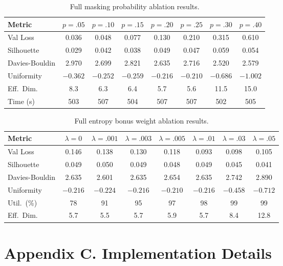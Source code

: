 \documentclass[pmlr]{jmlr}%
\begin{document}
\vspace{-1ex}
\begin{table}[!ht]
\centering
\caption{Full masking probability ablation results.}
\label{tab:app_masking}
\small\setlength{\tabcolsep}{4pt}
\begin{tabular}{lccccccc}
\toprule
\textbf{Metric} & $p{=}.05$ & $p{=}.10$ & $p{=}.15$ & $p{=}.20$ & $p{=}.25$ & $p{=}.30$ & $p{=}.40$ \\
\midrule
Val Loss & 0.036 & 0.048 & 0.077 & 0.130 & 0.210 & 0.315 & 0.610 \\
Silhouette & 0.029 & 0.042 & 0.038 & 0.049 & 0.047 & 0.059 & 0.054 \\
Davies-Bouldin & 2.970 & 2.699 & 2.821 & 2.635 & 2.716 & 2.520 & 2.579 \\
Uniformity & $-0.362$ & $-0.252$ & $-0.259$ & $-0.216$ & $-0.210$ & $-0.686$ & $-1.002$ \\
Eff.\ Dim. & 8.3 & 6.3 & 6.4 & 5.7 & 5.6 & 11.5 & 15.0 \\
Time (s) & 503 & 507 & 504 & 507 & 507 & 502 & 505 \\
\bottomrule
\end{tabular}
\end{table}

\vspace{-1ex}
\begin{table}[!ht]
\centering
\caption{Full entropy bonus weight ablation results.}
\label{tab:app_entropy}
\small\setlength{\tabcolsep}{4pt}
\begin{tabular}{lccccccc}
\toprule
\textbf{Metric} & $\lambda{=}0$ & $\lambda{=}.001$ & $\lambda{=}.003$ & $\lambda{=}.005$ & $\lambda{=}.01$ & $\lambda{=}.03$ & $\lambda{=}.05$ \\
\midrule
Val Loss & 0.146 & 0.138 & 0.130 & 0.118 & 0.093 & 0.098 & 0.105 \\
Silhouette & 0.049 & 0.050 & 0.049 & 0.048 & 0.049 & 0.045 & 0.041 \\
Davies-Bouldin & 2.635 & 2.601 & 2.635 & 2.654 & 2.635 & 2.742 & 2.890 \\
Uniformity & $-0.216$ & $-0.224$ & $-0.216$ & $-0.210$ & $-0.216$ & $-0.458$ & $-0.712$ \\
Util.\ (\%) & 78 & 91 & 95 & 97 & 98 & 99 & 99 \\
Eff.\ Dim. & 5.7 & 5.5 & 5.7 & 5.9 & 5.7 & 8.4 & 12.8 \\
\bottomrule
\end{tabular}
\end{table}

\section*{Appendix C. Implementation Details}
\label{app:implementation}
\end{document}
